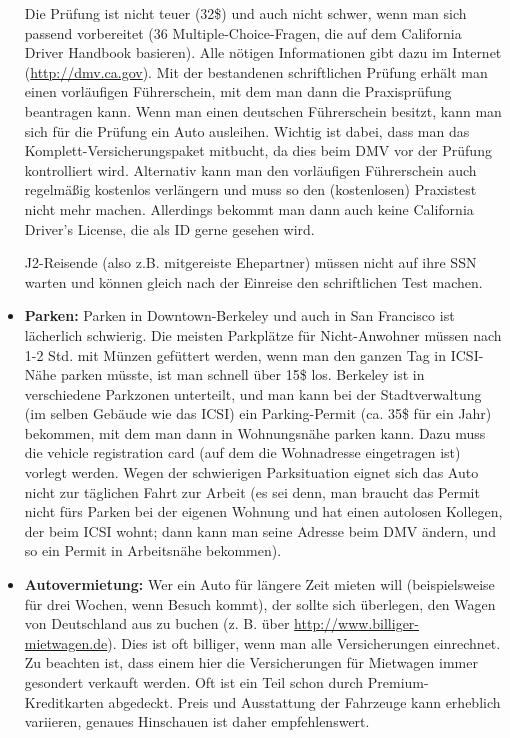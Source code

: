 \documentclass[a4paper]{scrreprt}
\begin{document}
\begin{itemize}
Die Prüfung ist nicht teuer (32\$) und auch nicht schwer, wenn man sich passend vorbereitet (36 Multiple-Choice-Fragen, die auf dem California Driver Handbook basieren). Alle nötigen Informationen gibt dazu im Internet (\url{http://dmv.ca.gov}). Mit der bestandenen schriftlichen Prüfung erhält man einen vorläufigen Führerschein, mit dem man dann die Praxisprüfung beantragen kann. Wenn man einen deutschen Führerschein besitzt, kann man sich für die Prüfung ein Auto ausleihen. Wichtig ist dabei, dass man das Komplett-Versicherungspaket mitbucht, da dies beim DMV vor der Prüfung kontrolliert wird. Alternativ kann man den vorläufigen Führerschein auch regelmäßig kostenlos verlängern und muss so den (kostenlosen) Praxistest nicht mehr machen. Allerdings bekommt man dann auch keine California Driver's License, die als ID gerne gesehen wird.

J2-Reisende (also z.B. mitgereiste Ehepartner) müssen nicht auf ihre SSN warten und können gleich nach der Einreise den schriftlichen Test machen.

	\item \textbf{Parken:} Parken in Downtown-Berkeley und auch in San Francisco ist lächerlich schwierig. Die meisten Parkplätze für Nicht-Anwohner müssen nach 1-2 Std. mit Münzen gefüttert werden, wenn man den ganzen Tag in ICSI-Nähe parken müsste, ist man schnell über 15\$ los. Berkeley ist in verschiedene Parkzonen unterteilt, und man kann bei der Stadtverwaltung (im selben Gebäude wie das ICSI) ein Parking-Permit (ca. 35\$ für ein Jahr) bekommen, mit dem man dann in Wohnungsnähe parken kann. Dazu muss die vehicle registration card (auf dem die Wohnadresse eingetragen ist) vorlegt werden. Wegen der schwierigen Parksituation eignet sich das Auto nicht zur täglichen Fahrt zur Arbeit (es sei denn, man braucht das Permit nicht fürs Parken bei der eigenen Wohnung und hat einen autolosen Kollegen, der beim ICSI wohnt; dann kann man seine Adresse beim DMV ändern, und so ein Permit in Arbeitsnähe bekommen).

	\item \textbf{Autovermietung:} Wer ein Auto für längere Zeit mieten will (beispielsweise für drei Wochen, wenn Besuch kommt), der sollte sich überlegen, den Wagen von Deutschland aus zu buchen (z. B. über  \url{http://www.billiger-mietwagen.de}). Dies ist oft billiger, wenn man alle Versicherungen einrechnet. Zu beachten ist, dass einem hier die Versicherungen für Mietwagen immer gesondert verkauft werden. Oft ist ein Teil schon durch Premium-Kreditkarten abgedeckt. Preis und Ausstattung der Fahrzeuge kann erheblich variieren, genaues Hinschauen ist daher empfehlenswert.


\end{itemize}
\end{document}
